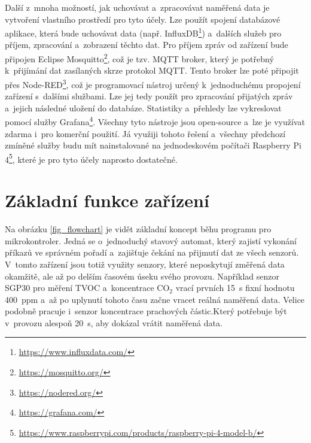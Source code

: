 Další z~mnoha možností, jak uchovávat a~zpracovávat naměřená data je vytvoření vlastního prostředí pro tyto účely. Lze použít spojení databázové aplikace, která bude uchovávat data (např. InfluxDB\footnote{\url{https://www.influxdata.com/}}) a~dalších služeb pro příjem, zpracování a~zobrazení těchto dat. Pro příjem zpráv od zařízení bude připojen Eclipse Mosquitto\footnote{\url{https://mosquitto.org/}}, což je tzv. MQTT broker, který je potřebný k~přijímání dat zasílaných skrze protokol MQTT. Tento broker lze poté připojit přes Node-RED\footnote{\url{https://nodered.org/}}, což je programovací nástroj určený k~jednoduchému propojení zařízení s~dalšími službami. Lze jej tedy použít pro zpracování přijatých zpráv a~jejich následné uložení do databáze. Statistiky a~přehledy lze vykreslovat pomocí služby Grafana\footnote{\url{https://grafana.com/}}. Všechny tyto nástroje jsou open-source a~lze je využívat zdarma i~pro komerční použití. Já využiji tohoto řešení a~všechny předchozí zmíněné služby budu mít nainstalované na jednodeskovém počítači Raspberry Pi 4\footnote{\url{https://www.raspberrypi.com/products/raspberry-pi-4-model-b/}}, které je pro tyto účely naprosto dostatečné.

\section{Základní funkce zařízení}

Na obrázku \ref{fig_flowchart} je vidět základní koncept běhu programu pro mikrokontroler. Jedná se o~jednoduchý stavový automat, který zajistí vykonání příkazů ve správném pořadí a~zajišťuje čekání na přijmutí dat ze všech senzorů. V~tomto zařízení jsou totiž využity senzory, které neposkytují změřená data okamžitě, ale až po delším časovém úseku svého provozu. Například senzor SGP30 pro měření TVOC a~koncentrace CO$_2$ vrací prvních \SI{15}{\second} fixní hodnotu 400~ppm a~až po uplynutí tohoto času začne vracet reálná naměřená data. Velice podobně pracuje i~senzor koncentrace prachových částic.Který potřebuje být v~provozu alespoň \SI{20}{\second}, aby dokázal vrátit naměřená data.


